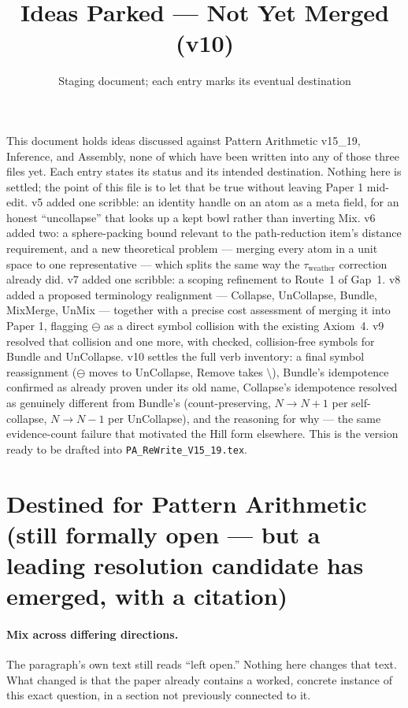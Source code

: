 \documentclass[11pt]{article}
\title{Ideas Parked --- Not Yet Merged (v10)}
\author{Staging document; each entry marks its eventual destination}
\date{}
\begin{document}
\maketitle

\noindent This document holds ideas discussed against Pattern Arithmetic
v15\_19, Inference, and Assembly, none of which have been written into
any of those three files yet. Each entry states its status and its
intended destination. Nothing here is settled; the point of this file
is to let that be true without leaving Paper 1 mid-edit.
v5 added one scribble: an identity handle on an atom as a meta field,
for an honest ``uncollapse'' that looks up a kept bowl rather than
inverting Mix. v6 added two: a sphere-packing bound relevant to the
path-reduction item's distance requirement, and a new theoretical
problem --- merging every atom in a unit space to one representative
--- which splits the same way the $\tau_{\text{weather}}$ correction
already did. v7 added one scribble: a scoping refinement to Route~1 of
Gap~1. v8 added a proposed terminology realignment --- Collapse,
UnCollapse, Bundle, MixMerge, UnMix --- together with a precise cost
assessment of merging it into Paper 1, flagging $\ominus$ as a direct
symbol collision with the existing Axiom~4. v9 resolved that
collision and one more, with checked, collision-free symbols for
Bundle and UnCollapse. v10 settles the full verb inventory: a final
symbol reassignment ($\ominus$ moves to UnCollapse, Remove takes
$\setminus$), Bundle's idempotence confirmed as already proven under
its old name, Collapse's idempotence resolved as genuinely different
from Bundle's (count-preserving, $N\to N{+}1$ per self-collapse,
$N\to N{-}1$ per UnCollapse), and the reasoning for why --- the same
evidence-count failure that motivated the Hill form elsewhere. This
is the version ready to be drafted into
\texttt{PA\_ReWrite\_V15\_19.tex}.

\section{Destined for Pattern Arithmetic (still formally open ---
but a leading resolution candidate has emerged, with a citation)}

\paragraph{Mix across differing directions.} The paragraph's own text
still reads ``left open.'' Nothing here changes that text. What
changed is that the paper already contains a worked, concrete instance
of this exact question, in a section not previously connected to it.
\end{document}
